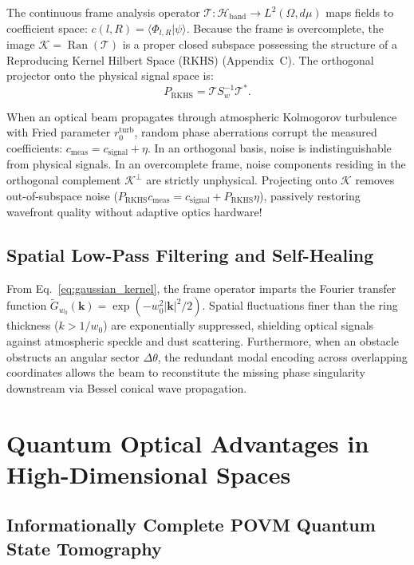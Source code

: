 \documentclass{optica-article}
\begin{document}
The continuous frame analysis operator $\mathcal{T}: \mathcal{H}_{\text{band}} \to L^2(\Omega, d\mu)$ maps fields to coefficient space: $c(l, R) = \langle \Phi_{l, R} | \psi \rangle$. Because the frame is overcomplete, the image $\mathcal{K} = \operatorname{Ran}(\mathcal{T})$ is a proper closed subspace possessing the structure of a Reproducing Kernel Hilbert Space (RKHS) (Appendix~C). The orthogonal projector onto the physical signal space is:
\begin{equation}
\boxed{P_{\text{RKHS}} = \mathcal{T} S_w^{-1} \mathcal{T}^*.}
\end{equation}

When an optical beam propagates through atmospheric Kolmogorov turbulence with Fried parameter $r_0^{\text{turb}}$, random phase aberrations corrupt the measured coefficients: $c_{\text{meas}} = c_{\text{signal}} + \eta$. In an orthogonal basis, noise is indistinguishable from physical signals. In an overcomplete frame, noise components residing in the orthogonal complement $\mathcal{K}^\perp$ are strictly unphysical. Projecting onto $\mathcal{K}$ removes out-of-subspace noise ($P_{\text{RKHS}} c_{\text{meas}} = c_{\text{signal}} + P_{\text{RKHS}} \eta$), passively restoring wavefront quality without adaptive optics hardware!

\subsection{Spatial Low-Pass Filtering and Self-Healing}

From Eq.~\eqref{eq:gaussian_kernel}, the frame operator imparts the Fourier transfer function $\widetilde{G}_{w_0}(\mathbf{k}) = \exp(-w_0^2 |\mathbf{k}|^2 / 2)$. Spatial fluctuations finer than the ring thickness ($k > 1/w_0$) are exponentially suppressed, shielding optical signals against atmospheric speckle and dust scattering. Furthermore, when an obstacle obstructs an angular sector $\Delta \theta$, the redundant modal encoding across overlapping coordinates allows the beam to reconstitute the missing phase singularity downstream via Bessel conical wave propagation.

\section{Quantum Optical Advantages in High-Dimensional Spaces}
\label{sec:quantum_advantages}

\subsection{Informationally Complete POVM Quantum State Tomography}
\end{document}

